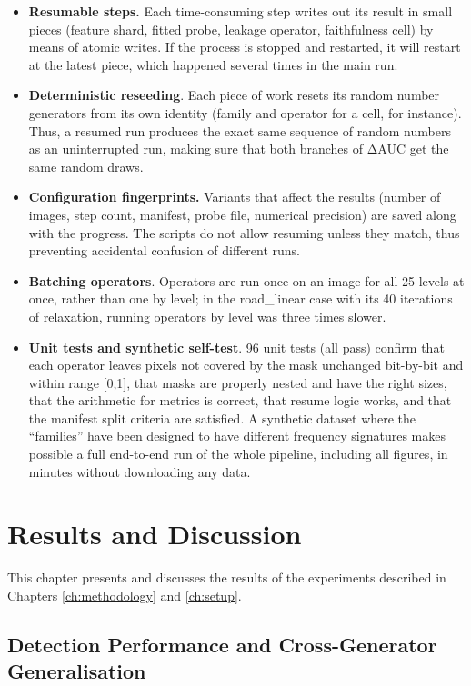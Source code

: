 \begin{itemize}
\item
  \textbf{Resumable steps.} Each time-consuming step writes out its
  result in small pieces (feature shard, fitted probe, leakage operator,
  faithfulness cell) by means of atomic writes. If the process is
  stopped and restarted, it will restart at the latest piece, which
  happened several times in the main run.
\item
  \textbf{Deterministic reseeding}. Each piece of work resets its random
  number generators from its own identity (family and operator for a
  cell, for instance). Thus, a resumed run produces the exact same
  sequence of random numbers as an uninterrupted run, making sure that
  both branches of ΔAUC get the same random draws.
\item
  \textbf{Configuration fingerprints.} Variants that affect the results
  (number of images, step count, manifest, probe file, numerical
  precision) are saved along with the progress. The scripts do not allow
  resuming unless they match, thus preventing accidental confusion of
  different runs.
\item
  \textbf{Batching operators}. Operators are run once on an image for
  all 25 levels at once, rather than one by level; in the road\_linear
  case with its 40 iterations of relaxation, running operators by level
  was three times slower.
\item
  \textbf{Unit tests and synthetic self-test}. 96 unit tests (all pass)
  confirm that each operator leaves pixels not covered by the mask
  unchanged bit-by-bit and within range {[}0,1{]}, that masks are
  properly nested and have the right sizes, that the arithmetic for
  metrics is correct, that resume logic works, and that the manifest
  split criteria are satisfied. A synthetic dataset where the
  ``families'' have been designed to have different frequency signatures
  makes possible a full end-to-end run of the whole pipeline, including
  all figures, in minutes without downloading any data.
\end{itemize}

\chapter{Results and Discussion}

This chapter presents and discusses the results of the experiments
described in Chapters \ref{ch:methodology} and \ref{ch:setup}.

\section{Detection Performance and Cross-Generator Generalisation}

